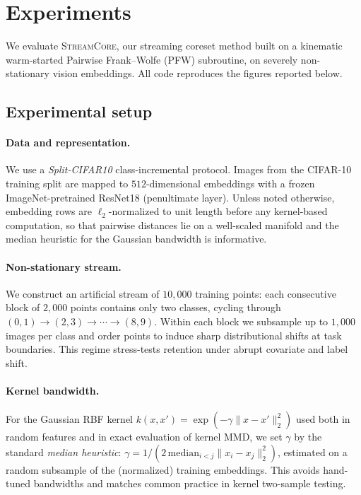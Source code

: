 
\section{Experiments}
\label{sec:experiments}

We evaluate \textsc{StreamCore}, our streaming coreset method built on a kinematic warm-started Pairwise Frank--Wolfe (PFW) subroutine, on severely non-stationary vision embeddings. All code reproduces the figures reported below.

\subsection{Experimental setup}
\label{sec:exp-setup}

\paragraph{Data and representation.}
We use a \emph{Split-CIFAR10} class-incremental protocol. Images from the CIFAR-10 training split are mapped to $512$-dimensional embeddings with a frozen ImageNet-pretrained ResNet18 (penultimate layer). Unless noted otherwise, embedding rows are $\ell_2$-normalized to unit length before any kernel-based computation, so that pairwise distances lie on a well-scaled manifold and the median heuristic for the Gaussian bandwidth is informative.

\paragraph{Non-stationary stream.}
We construct an artificial stream of $10{,}000$ training points: each consecutive block of $2{,}000$ points contains only two classes, cycling through $(0,1)\to(2,3)\to\cdots\to(8,9)$. Within each block we subsample up to $1{,}000$ images per class and order points to induce sharp distributional shifts at task boundaries. This regime stress-tests retention under abrupt covariate and label shift.

\paragraph{Kernel bandwidth.}
For the Gaussian RBF kernel $k(x,x')=\exp(-\gamma\|x-x'\|_2^2)$ used both in random features and in exact evaluation of kernel MMD, we set $\gamma$ by the standard \emph{median heuristic}: $\gamma = 1 / (2\,\mathrm{median}_{i<j}\|x_i-x_j\|_2^2)$, estimated on a random subsample of the (normalized) training embeddings. This avoids hand-tuned bandwidths and matches common practice in kernel two-sample testing.

